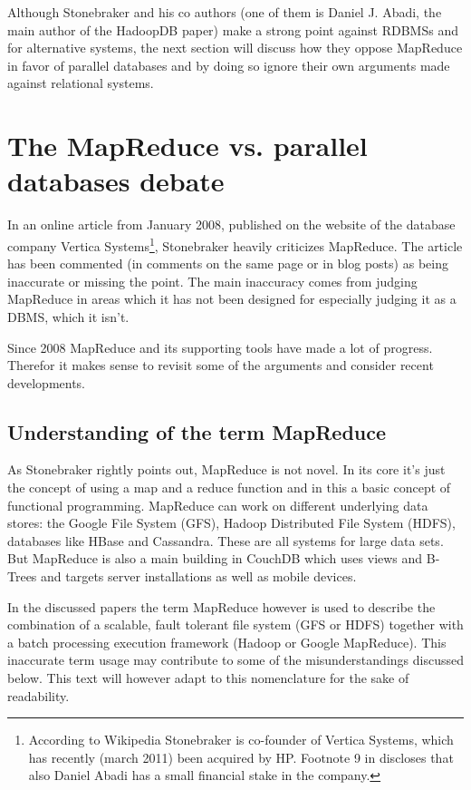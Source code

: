 \documentclass[12pt,a4paper]{scrartcl}		%
\begin{document}
Although Stonebraker and his co authors (one of them is Daniel J. Abadi, the main author of the HadoopDB paper) make a strong point against RDBMSs and for alternative systems, the next section will discuss how they oppose MapReduce in favor of parallel databases and by doing so ignore their own arguments made against relational systems.

\section{The MapReduce vs. parallel databases debate}
In an online article from January 2008, published on the website of the database company Vertica Systems\footnote
{According to Wikipedia Stonebraker is co-founder of Vertica Systems, which has recently (march 2011) been acquired by HP. Footnote 9 in \cite{journals/pvldb/AbouzeidBARS09} discloses that also Daniel Abadi has a small financial stake in the company.},
Stonebraker heavily criticizes MapReduce.\cite{sto08stepback} The article has been commented (in comments on the same page or in blog posts\cite{Chu-Carrol08hammers}) as being inaccurate or missing the point. The main inaccuracy comes from judging MapReduce in areas which it has not been designed for especially judging it as a DBMS, which it isn't.

Since 2008 MapReduce and its supporting tools have made a lot of progress. Therefor it makes sense to revisit some of the arguments and consider recent developments.

\subsection{Understanding of the term MapReduce}
As Stonebraker rightly points out, MapReduce is not novel. In its core it's just the concept of using a map and a reduce function and in this a basic concept of functional programming. MapReduce can work on different underlying data stores: the Google File System (GFS), Hadoop Distributed File System (HDFS), databases like HBase and Cassandra. These are all systems for large data sets. But MapReduce is also a main building in CouchDB which uses views and B-Trees and targets server installations as well as mobile devices.

In the discussed papers the term MapReduce however is used to describe the combination of a scalable, fault tolerant file system (GFS or HDFS) together with a batch processing execution framework (Hadoop or Google MapReduce).
This inaccurate term usage may contribute to some of the misunderstandings discussed below. This text will however adapt to this nomenclature for the sake of readability.
\end{document}
